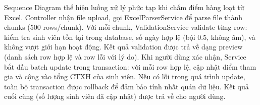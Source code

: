     Sequence Diagram thể hiện luồng xử lý phức tạp khi chấm điểm hàng loạt từ Excel. Controller nhận file upload, gọi ExcelParserService để parse file thành chunks (500 rows/chunk). Với mỗi chunk, ValidationService validate từng row: kiểm tra sinh viên tồn tại trong database, số ngày hợp lệ (bội 0.5, không âm), và không vượt giới hạn hoạt động. Kết quả validation được trả về dạng preview (danh sách row hợp lệ và row lỗi với lý do). Khi người dùng xác nhận, Service bắt đầu batch update trong transaction: với mỗi row hợp lệ, cập nhật điểm tham gia và cộng vào tổng CTXH của sinh viên. Nếu có lỗi trong quá trình update, toàn bộ transaction được rollback để đảm bảo tính nhất quán dữ liệu. Kết quả cuối cùng (số lượng sinh viên đã cập nhật) được trả về cho người dùng.
